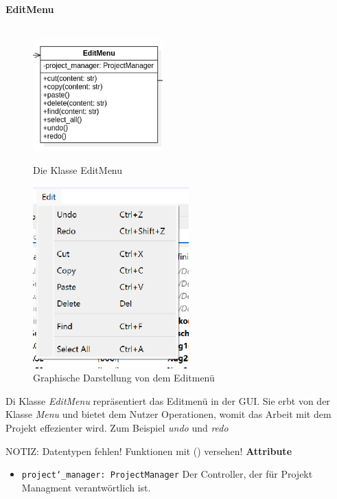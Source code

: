 \documentclass{article}
\begin{document}
\newpage
\textbf{\large{EditMenu}}\\\\
\begin{figure}[H]%
    \centering
    \begin{minipage}[b]{0.4\textwidth}
        \includegraphics[width=5cm]{entwurf/Entwurf_dokument/img/Alissa/EditMenuUpdated.png}
        \caption{Die Klasse EditMenu}
    \end{minipage}
    \hfill
    \begin{minipage}[b]{0.4\textwidth}
        \includegraphics[width=6cm]{entwurf/Entwurf_dokument/img/Alissa/FileMenuGUI.png} %
        \caption{Graphische Darstellung von dem Editmenü}
    \end{minipage}
\end{figure}
Di Klasse \textit{EditMenu} repräsentiert das Editmenü in der GUI. Sie erbt von der Klasse \textit{Menu} und bietet dem Nutzer Operationen, womit das Arbeit mit dem Projekt effezienter wird. Zum Beispiel \textit{undo} und \textit{redo}
\newline \newline

NOTIZ: Datentypen fehlen! Funktionen mit () versehen!
\textbf{{Attribute}}
\begin{itemize}
\item \texttt{project\char`_manager: ProjectManager} \newline Der Controller, der für Projekt Managment verantwörtlich ist.
\end{itemize}
\end{document}
